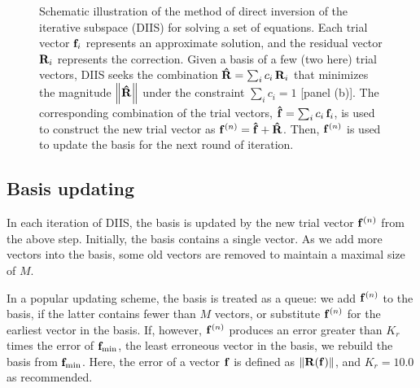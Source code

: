 \documentclass[reprint,aip,jcp,superscriptaddress]{revtex4-1}
\begin{document}
\begin{figure}
  \caption{\label{fig:scheme}
    Schematic illustration of the method of
    direct inversion of the iterative subspace (DIIS)
    for solving a set of equations.
    Each trial vector $\mathbf{f}_i$
    represents an approximate solution,
    and the residual vector $\mathbf{R}_i$
    represents the correction.
    Given a basis of a few (two here) trial vectors,
    DIIS seeks the combination
    $\mathbf{\hat R} = \sum_i c_i \, \mathbf{R}_i$
    that minimizes the magnitude
    $\left\| \mathbf{\hat R} \right\|$
    under the constraint
    $\sum_i c_i = 1$ [panel (b)].
    The corresponding combination
    of the trial vectors,
    $\mathbf{\hat f} = \sum_i c_i \, \mathbf{f}_i$,
    is used to construct
    the new trial vector as
    $\mathbf{f}^{(n)} = \mathbf{\hat f} + \mathbf{\hat R}$.
    Then, $\mathbf{f}^{(n)}$ is used to
    update the basis
    for the next round of iteration.
  }
\end{figure}




\subsection{Basis updating}



In each iteration of DIIS,
the basis is updated
by the new trial vector $\mathbf{f}^{(n)}$
from the above step.
%
Initially,
the basis contains a single vector.
%
As we add more vectors into the basis,
some old vectors are removed
to maintain a maximal size of $M$.



In a popular updating scheme\cite{kovalenko1999},
the basis is treated as a queue:
%
we add $\mathbf{f}^{(n)}$ to the basis,
if the latter contains fewer than $M$ vectors,
%
or substitute $\mathbf{f}^{(n)}$ for the earliest vector in the basis.
%
If, however, $\mathbf{f}^{(n)}$
produces an error greater than
$K_r$ times the error of
$\mathbf{f}_\mathrm{min}$,
the least erroneous vector in the basis,
%
we rebuild the basis
from $\mathbf{f}_\mathrm{min}$.
%
Here, the error of a vector $\mathbf{f}$ is defined as
$\left\| \mathbf{R}(\mathbf{f}) \right\|$,
and
$K_r = 10.0$ as recommended\cite{
kovalenko1999}.
\end{document}

